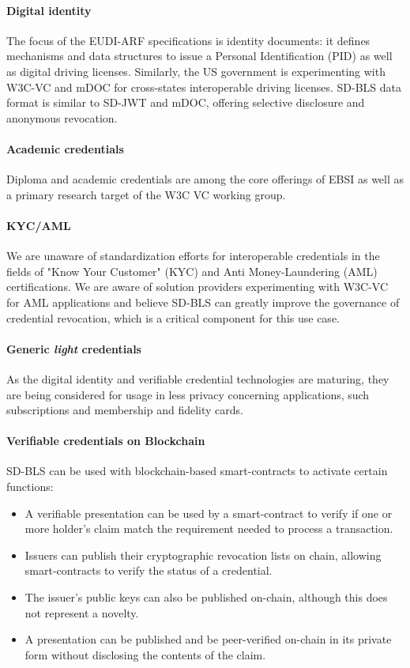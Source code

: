 \paragraph{Digital identity}
The focus of the EUDI-ARF specifications is identity documents: it
defines mechanisms and data structures to issue a Personal
Identification (PID) as well as digital driving licenses. Similarly,
the US government is experimenting with W3C-VC and mDOC for
cross-states interoperable driving licenses. SD-BLS data format is
similar to SD-JWT and mDOC, offering selective disclosure and
anonymous revocation.

\paragraph{Academic credentials}
Diploma and academic credentials are among the core offerings of EBSI
as well as a primary research target of the W3C VC working group.

\paragraph{KYC/AML}
We are unaware of standardization efforts for interoperable
credentials in the fields of "Know Your Customer" (KYC) and Anti
Money-Laundering (AML) certifications. We are aware of solution
providers experimenting with W3C-VC for AML applications and believe
SD-BLS can greatly improve the governance of credential revocation,
which is a critical component for this use case.

\paragraph{Generic \textit{light} credentials}
As the digital identity and verifiable credential technologies are
maturing, they are being considered for usage in less privacy
concerning applications, such subscriptions and membership and
fidelity cards.

\paragraph{Verifiable credentials on Blockchain}
SD-BLS can be used with blockchain-based smart-contracts to activate
certain functions:
\begin{itemize}
    \item A verifiable presentation can be used by a smart-contract to
      verify if one or more holder's claim match the requirement
      needed to process a transaction.
    \item Issuers can publish their cryptographic revocation lists on
      chain, allowing smart-contracts to verify the status of a
      credential.
    \item The issuer's public keys can also be published on-chain,
      although this does not represent a novelty.
    \item A presentation can be published and be peer-verified
      on-chain in its private form without disclosing the contents of
      the claim.
\end{itemize}

